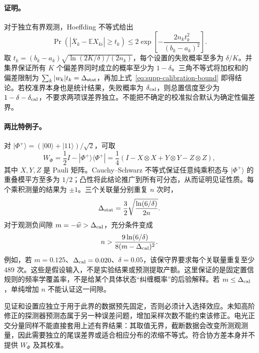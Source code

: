 \documentclass[UTF8,11pt,a4paper,fontset=none]{ctexart}
\begin{document}
\paragraph{证明。}
对于独立有界观测，Hoeffding 不等式给出 \cite{Hoeffding1963}
\begin{equation}
\Pr\!\left(|\overline X_k-\mathbb E X_{ki}|\geq t_k\right)
\leq2\exp\!\left[-\frac{2n_kt_k^2}{(b_k-a_k)^2}\right].
\end{equation}
取 $t_k=(b_k-a_k)\sqrt{\ln(2K/\delta)/(2n_k)}$，每个设置的失败概率至多为 $\delta/K$。并集界保证所有 $K$ 个偏差界同时成立的概率至少为 $1-\delta$。三角不等式将加权和的偏差限制为 $\sum_k|w_k|t_k=\Delta_{\rm stat}$，再加上式~\eqref{eq:supp-calibration-bound} 即得结论。若校准界本身也是统计结果，失败概率为 $\delta_{\rm cal}$，则总置信度至少为 $1-\delta-\delta_{\rm cal}$，不要求两项误差界独立。不能把不确定的校准拟合默认为确定性偏差界。

\paragraph{两比特例子。}
对 $|\Phi^+\rangle=(|00\rangle+|11\rangle)/\sqrt2$，可取
\begin{equation}
W_{\Phi}=\frac12I-|\Phi^+\rangle\langle\Phi^+|
=\frac14(I-X\otimes X+Y\otimes Y-Z\otimes Z),
\label{eq:supp-pauli-witness}
\end{equation}
其中 $X,Y,Z$ 是 Pauli 矩阵。Cauchy--Schwarz 不等式保证任意纯乘积态与 $|\Phi^+\rangle$ 的重叠模平方至多为 $1/2$；凸性将此结论推广到所有可分态，从而证明见证性质。每个乘积测量的结果为 $\pm1$。三个关联量分别重复 $n$ 次时，
\begin{equation}
\Delta_{\rm stat}=\frac32\sqrt{\frac{\ln(6/\delta)}{2n}}.
\end{equation}
对于观测负间隙 $m=-\widehat w>\Delta_{\rm cal}$，充分条件变成
\begin{equation}
n>\frac{9\ln(6/\delta)}{8(m-\Delta_{\rm cal})^2}.
\label{eq:supp-pauli-shot-budget}
\end{equation}
例如，若 $m=0.125$、$\Delta_{\rm cal}=0.020$、$\delta=0.05$，该保守界要求每个关联量重复至少 $489$ 次。这些是假设输入，不是实验结果或预测提取产额。这里保证的是固定置信规则的频率学覆盖率，不是给某个具体状态“纠缠概率”的后验解释。若 $m\leq\Delta_{\rm cal}$，单纯增加 $n$ 不能认证这一间隙。

见证和设置应独立于用于此界的数据预先固定，否则必须计入选择效应。未知高阶修正的探测器预测态属于另一种误差问题，增加采样次数不能约束该修正。电光正交分量同样不能直接套用上述有界结果：其取值无界，截断数据会改变所测观测量，因此需要独立的尾误差界或适合相应分布的浓缩不等式。符合协方差本身并不提供 $W_{\Phi}$ 及其校准。
\end{document}
